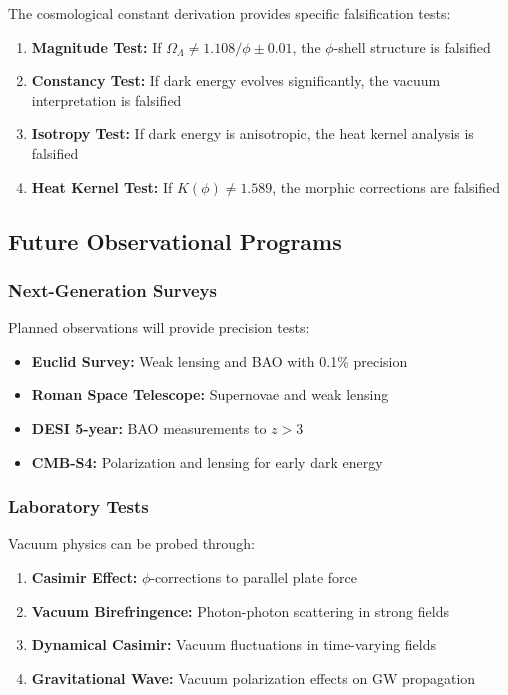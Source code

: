 The cosmological constant derivation provides specific falsification tests:

\begin{enumerate}
\item \textbf{Magnitude Test:} If $\Omega_\Lambda \neq 1.108/\phi \pm 0.01$, the $\phi$-shell structure is falsified
\item \textbf{Constancy Test:} If dark energy evolves significantly, the vacuum interpretation is falsified  
\item \textbf{Isotropy Test:} If dark energy is anisotropic, the heat kernel analysis is falsified
\item \textbf{Heat Kernel Test:} If $K(\phi) \neq 1.589$, the morphic corrections are falsified
\end{enumerate}

\subsection{Future Observational Programs}

\subsubsection{Next-Generation Surveys}

Planned observations will provide precision tests:
\begin{itemize}
\item \textbf{Euclid Survey:} Weak lensing and BAO with 0.1\% precision
\item \textbf{Roman Space Telescope:} Supernovae and weak lensing
\item \textbf{DESI 5-year:} BAO measurements to $z > 3$
\item \textbf{CMB-S4:} Polarization and lensing for early dark energy
\end{itemize}

\subsubsection{Laboratory Tests}

Vacuum physics can be probed through:
\begin{enumerate}
\item \textbf{Casimir Effect:} $\phi$-corrections to parallel plate force
\item \textbf{Vacuum Birefringence:} Photon-photon scattering in strong fields
\item \textbf{Dynamical Casimir:} Vacuum fluctuations in time-varying fields
\item \textbf{Gravitational Wave:} Vacuum polarization effects on GW propagation
\end{enumerate}

